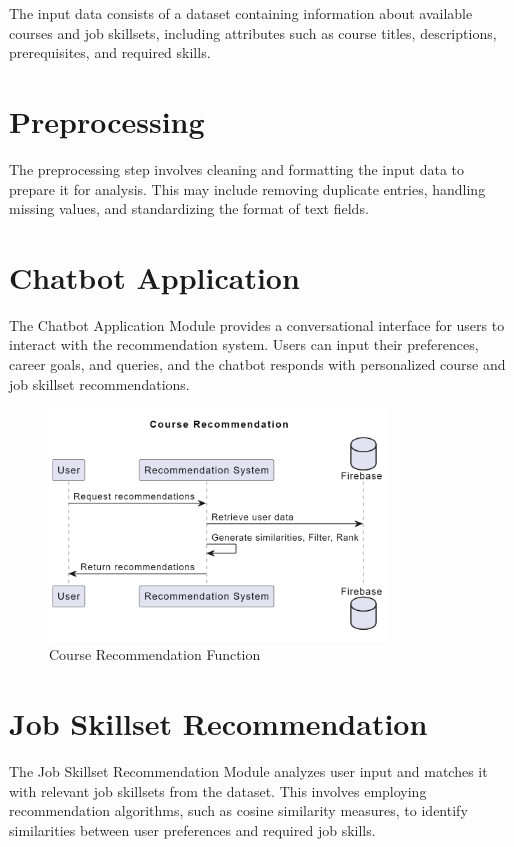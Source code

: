 The input data consists of a dataset containing information about available courses and job skillsets, including attributes such as course titles, descriptions, prerequisites, and required skills.

\section{Preprocessing}

The preprocessing step involves cleaning and formatting the input data to prepare it for analysis. This may include removing duplicate entries, handling missing values, and standardizing the format of text fields.

\section{Chatbot Application}

The Chatbot Application Module provides a conversational interface for users to interact with the recommendation system. Users can input their preferences, career goals, and queries, and the chatbot responds with personalized course and job skillset recommendations.

\begin{figure}[h]
\centering
\includegraphics[width=0.8\textwidth]{3/course.png}
\caption{Course Recommendation Function}
\label{fig:course_recommendation}
\end{figure}

\section{Job Skillset Recommendation}

The Job Skillset Recommendation Module analyzes user input and matches it with relevant job skillsets from the dataset. This involves employing recommendation algorithms, such as cosine similarity measures, to identify similarities between user preferences and required job skills.

